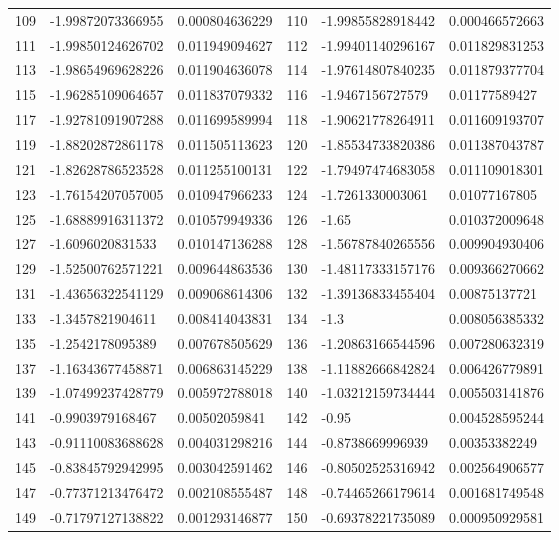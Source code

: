 \documentclass{amsart}
\numberwithin{equation}{section}
\numberwithin{table}{section}
\begin{document}
\begin{longtable}{@{}rll@{\hspace{2.2em}}rll@{}}
109 & -1.99872073366955 & 0.000804636229 & 110 & -1.99855828918442 & 0.000466572663 \\
111 & -1.99850124626702 & 0.011949094627 & 112 & -1.99401140296167 & 0.011829831253 \\
113 & -1.98654969628226 & 0.011904636078 & 114 & -1.97614807840235 & 0.011879377704 \\
115 & -1.96285109064657 & 0.011837079332 & 116 & -1.9467156727579 & 0.01177589427 \\
117 & -1.92781091907288 & 0.011699589994 & 118 & -1.90621778264911 & 0.011609193707 \\
119 & -1.88202872861178 & 0.011505113623 & 120 & -1.85534733820386 & 0.011387043787 \\
121 & -1.82628786523528 & 0.011255100131 & 122 & -1.79497474683058 & 0.011109018301 \\
123 & -1.76154207057005 & 0.010947966233 & 124 & -1.7261330003061 & 0.01077167805 \\
125 & -1.68889916311372 & 0.010579949336 & 126 & -1.65 & 0.010372009648 \\
127 & -1.6096020831533 & 0.010147136288 & 128 & -1.56787840265556 & 0.009904930406 \\
129 & -1.52500762571221 & 0.009644863536 & 130 & -1.48117333157176 & 0.009366270662 \\
131 & -1.43656322541129 & 0.009068614306 & 132 & -1.39136833455404 & 0.00875137721 \\
133 & -1.3457821904611 & 0.008414043831 & 134 & -1.3 & 0.008056385332 \\
135 & -1.2542178095389 & 0.007678505629 & 136 & -1.20863166544596 & 0.007280632319 \\
137 & -1.16343677458871 & 0.006863145229 & 138 & -1.11882666842824 & 0.006426779891 \\
139 & -1.07499237428779 & 0.005972788018 & 140 & -1.03212159734444 & 0.005503141876 \\
141 & -0.9903979168467 & 0.00502059841 & 142 & -0.95 & 0.004528595244 \\
143 & -0.91110083688628 & 0.004031298216 & 144 & -0.8738669996939 & 0.00353382249 \\
145 & -0.83845792942995 & 0.003042591462 & 146 & -0.80502525316942 & 0.002564906577 \\
147 & -0.77371213476472 & 0.002108555487 & 148 & -0.74465266179614 & 0.001681749548 \\
149 & -0.71797127138822 & 0.001293146877 & 150 & -0.69378221735089 & 0.000950929581 \\

\end{longtable}
\end{document}
